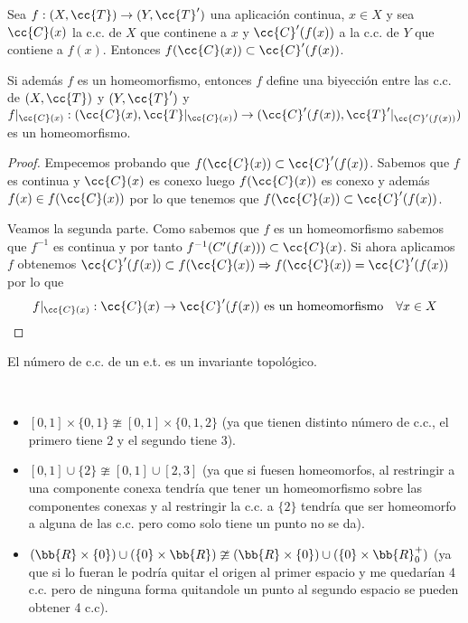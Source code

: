 \begin{teo}
    Sea $f:(X, \cc{T})\to (Y, \cc{T}')$ una aplicación continua, $x\in X$ y sea $\cc{C}(x)$ la c.c. de $X$ que continene a $x$ y $\cc{C}'(f(x))$ a la c.c. de $Y$ que contiene a $f(x)$. Entonces $f(\cc{C}(x))\subset \cc{C}'(f(x))$. 
    
    Si además $f$ es un homeomorfismo, entonces $f$ define una biyección entre las c.c. de $(X, \cc{T})$ y $(Y, \cc{T}')$ y $f|_{\cc{C}(x)}:(\cc{C}(x), \cc{T}|_{\cc{C}(x)})\to (\cc{C}'(f(x)), \cc{T}'|_{\cc{C}'(f(x))})$ es un homeomorfismo.

    \begin{proof}
        Empecemos probando que $f(\cc{C}(x))\subset \cc{C}'(f(x))$. Sabemos que $f$ es continua y $\cc{C}(x)$ es conexo luego $f(\cc{C}(x))$ es conexo y además $f(x)\in f(\cc{C}(x))$ por lo que tenemos que $f(\cc{C}(x))\subset \cc{C}'(f(x))$.

        Veamos la segunda parte. Como sabemos que $f$ es un homeomorfismo sabemos que $f^{-1}$ es continua y por tanto $f^{-1}(C'(f(x)))\subset \cc{C}(x)$. Si ahora aplicamos $f$ obtenemos $\cc{C}'(f(x))\subset f(\cc{C}(x)) \Rightarrow f(\cc{C}(x))=\cc{C}'(f(x))$ por lo que 
        \begin{align*}
            f|_{\cc{C}(x)}: \cc{C}(x)\to \cc{C}'(f(x))\text{ es un homeomorfismo } \ \ \forall x \in X
        \end{align*}
    \end{proof}
\end{teo}

\begin{coro}
    El número de c.c. de un e.t. es un invariante topológico.
    \endsquare
\end{coro}

\begin{ejemplo}\
    \begin{itemize}
        \item $[0,1]\times \{0,1\} \ncong [0,1]\times \{0,1,2\}$ (ya que tienen distinto número de c.c., el primero tiene 2 y el segundo tiene 3).
        \item $[0,1]\cup\{2\} \ncong [0,1]\cup [2,3]$ (ya que si fuesen homeomorfos, al restringir a una componente conexa tendría que tener un homeomorfismo sobre las componentes conexas y al restringir la c.c. a $\{2\}$ tendría que ser homeomorfo a alguna de las c.c. pero como solo tiene un punto no se da).
        \item $(\bb{R}\times \{0\})\cup (\{0\}\times \bb{R}) \ncong (\bb{R}\times \{0\})\cup (\{0\}\times \bb{R}_0^+)$ (ya que si lo fueran le podría quitar el origen al primer espacio y me quedarían 4 c.c. pero de ninguna forma quitandole un punto al segundo espacio se pueden obtener 4 c.c).
    \end{itemize}
\end{ejemplo}

